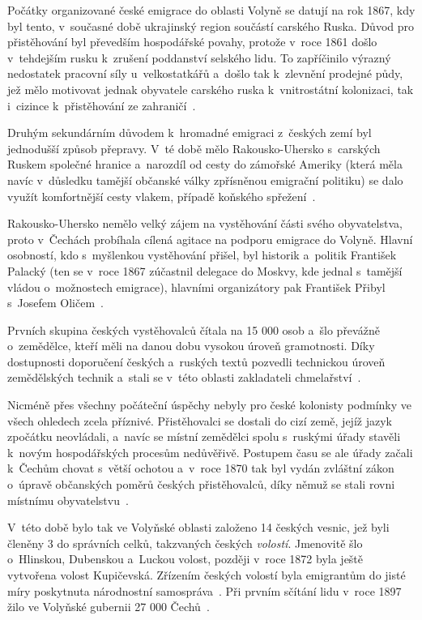 Počátky organizované české emigrace do oblasti Volyně se datují na rok 1867, kdy byl tento, v~současné době ukrajinský region součástí carského Ruska. Důvod pro přistěhování byl převedším hospodářské povahy, protože v~roce 1861 došlo v~tehdejším rusku k~zrušení poddanství selského lidu. To zapříčinilo výrazný nedostatek pracovní síly u~velkostatkářů a~došlo tak k~zlevnění prodejné půdy, jež mělo motivovat jednak obyvatele carského ruska k~vnitrostátní kolonizaci, tak i~cizince k~přistěhování ze zahraničí~\parencite{Auerhan1920}.

Druhým sekundárním důvodem k~hromadné emigraci z~českých zemí byl jednodušší způsob přepravy. V~té době mělo Rakousko-Uhersko s~carských Ruskem společné hranice a~narozdíl od cesty do zámořské Ameriky (která měla navíc v~důsledku tamější občanské války zpřísněnou emigrační politiku) se dalo využít komfortnější cesty vlakem, případě koňského spřežení~\parencite{Hofman2020}.

Rakousko-Uhersko nemělo velký zájem na vystěhování části svého obyvatelstva, proto v~Čechách probíhala cílená agitace na podporu emigrace do Volyně. Hlavní osobností, kdo s~myšlenkou vystěhování přišel, byl historik a~politik František Palacký (ten se v~roce 1867 zúčastnil delegace do Moskvy, kde jednal s~tamější vládou o~možnostech emigrace), hlavními organizátory pak František Přibyl s~Josefem Oličem~\parencite{Hofman2020}.

Prvních skupina českých vystěhovalců čítala na 15 000 osob a~šlo převážně o~zemědělce, kteří měli na danou dobu vysokou úroveň gramotnosti. Díky dostupnosti doporučení českých a~ruských textů pozvedli technickou úroveň zemědělských technik a~stali se v~této oblasti zakladateli chmelařství~\parencite{Vaculik2009b}.

Nicméně přes všechny počáteční úspěchy nebyly pro české kolonisty podmínky ve všech ohledech zcela příznivé. Přistěhovalci se dostali do cizí země, jejíž jazyk zpočátku neovládali, a~navíc se místní zemědělci spolu s~ruskými úřady stavěli k~novým hospodářských procesům nedůvěřivě. Postupem času se ale úřady začali k~Čechům chovat s~větší ochotou a~v~roce 1870 tak byl vydán zvláštní zákon o~úpravě občanských poměrů českých přistěhovalců, díky němuž se stali rovni místnímu obyvatelstvu~\parencite{Auerhan1920}.

V~této době bylo tak ve Volyňské oblasti založeno 14 českých vesnic, jež byli členěny 3 do správních celků, takzvaných českých \emph{volostí}. Jmenovitě šlo o~Hlinskou, Dubenskou a~Luckou volost, později v~roce 1872 byla ještě vytvořena volost Kupičevská. Zřízením českých volostí byla emigrantům do jisté míry poskytnuta národnostní samospráva~\parencite{Auerhan1920}. Při prvním sčítání lidu v~roce 1897 žilo ve Volyňské gubernii 27 000 Čechů~\parencite{Vaculik2009a}.

